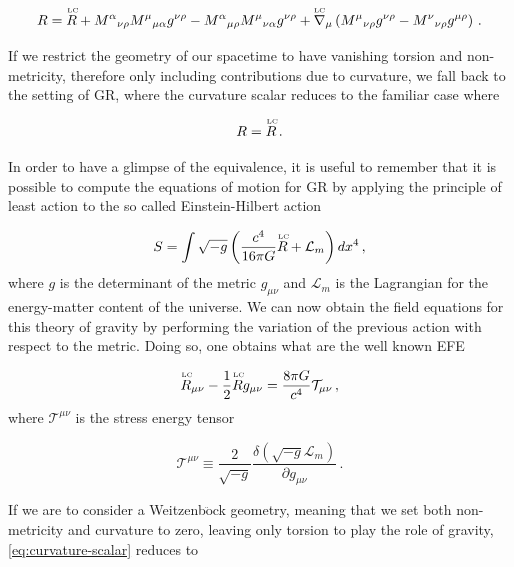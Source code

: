 \begin{equation}
    \label{eq:curvature-scalar}
    R = \overtext{LC}{R} + M^{\alpha}{}_{\nu \rho} M^{\mu}{}_{\mu \alpha} g^{\nu \rho} -
    M^{\alpha}{}_{\mu \rho} M^{\mu}{}_{\nu \alpha} g^{\nu \rho} +
    \overtext{LC}{\nabla}_{\mu} \left( M^{\mu}{}_{\nu \rho} g^{\nu \rho}
    - M^{\nu}{}_{\nu \rho} g^{\mu \rho} \right) \,.
\end{equation}

If we restrict the geometry of our spacetime to have vanishing torsion and non-metricity, therefore only including contributions due to curvature, we fall back to the setting of \gls{GR}, where the curvature scalar reduces to the familiar case where

\begin{equation}
    \label{eq:R-RLC}
    R = \overtext{LC}{R} \,.
\end{equation}

In order to have a glimpse of the equivalence, it is useful to remember that it is possible to compute the equations of motion for \gls{GR} by applying the principle of least action to the so called Einstein-Hilbert action

\begin{equation}
    \label{eq:action}
    S = \int \sqrt{-g} \left(  \frac{c^4}{16 \pi G} \overtext{LC}{R} + \mathcal{L}_m \right) dx^4 \,,
\end{equation}
where $g$ is the determinant of the metric $g_{\mu \nu}$ and $\mathcal{L}_m$ is the Lagrangian for the energy-matter content of the universe. We can now obtain the field equations for this theory of gravity by performing the variation of the previous action with respect to the metric. Doing so, one obtains what are the well known \gls{EFE}

\begin{equation}
    \label{eq:EFE}
    \overtext{LC}{R}_{\mu \nu} - \frac{1}{2} \overtext{LC}{R} g_{\mu \nu} = \frac{8 \pi G}{c^4} \mathcal{T}_{\mu \nu} \,,
\end{equation}
where $\mathcal{T}^{\mu \nu}$ is the stress energy tensor

\begin{equation}
    \label{stress-energy-tensor}
    \mathcal{T}^{\mu \nu} \equiv
    \frac{2}{\sqrt{-g}} \frac{\delta (\sqrt{-g} \mathcal{L}_m)}{\partial g_{\mu \nu}} \,.
\end{equation}

If we are to consider a Weitzenb$\ddot{\text{o}}$ck geometry, meaning that we set both non-metricity and curvature to zero, leaving only torsion to play the role of gravity, \cref{eq:curvature-scalar} reduces to

